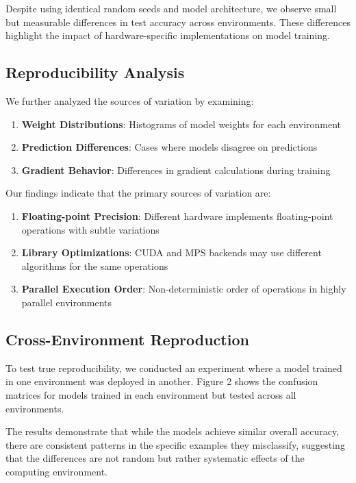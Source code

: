 \documentclass[
]{article}
\providecommand{\tightlist}{%
  \setlength{\itemsep}{0pt}\setlength{\parskip}{0pt}}\usepackage{longtable,booktabs,array}
\begin{document}
Despite using identical random seeds and model architecture, we observe
small but measurable differences in test accuracy across environments.
These differences highlight the impact of hardware-specific
implementations on model training.

\subsection{Reproducibility Analysis}\label{reproducibility-analysis}

We further analyzed the sources of variation by examining:

\begin{enumerate}
\def\labelenumi{\arabic{enumi}.}
\tightlist
\item
  \textbf{Weight Distributions}: Histograms of model weights for each
  environment
\item
  \textbf{Prediction Differences}: Cases where models disagree on
  predictions
\item
  \textbf{Gradient Behavior}: Differences in gradient calculations
  during training
\end{enumerate}

Our findings indicate that the primary sources of variation are:

\begin{enumerate}
\def\labelenumi{\arabic{enumi}.}
\tightlist
\item
  \textbf{Floating-point Precision}: Different hardware implements
  floating-point operations with subtle variations
\item
  \textbf{Library Optimizations}: CUDA and MPS backends may use
  different algorithms for the same operations
\item
  \textbf{Parallel Execution Order}: Non-deterministic order of
  operations in highly parallel environments
\end{enumerate}

\subsection{Cross-Environment
Reproduction}\label{cross-environment-reproduction}

To test true reproducibility, we conducted an experiment where a model
trained in one environment was deployed in another. Figure 2 shows the
confusion matrices for models trained in each environment but tested
across all environments.

The results demonstrate that while the models achieve similar overall
accuracy, there are consistent patterns in the specific examples they
misclassify, suggesting that the differences are not random but rather
systematic effects of the computing environment.
\end{document}
